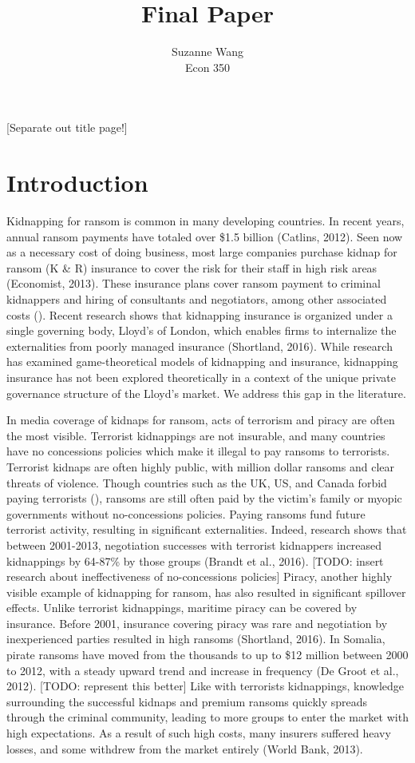 \documentclass[12pt]{article}
\begin{document}
 
\title{Final Paper}
\author{Suzanne Wang \\ 
Econ 350} 
\maketitle

[Separate out title page!]

\section{Introduction}

Kidnapping for ransom is common in many developing countries. In recent years, annual ransom payments have totaled over \$1.5 billion (Catlins, 2012). Seen now as a necessary cost of doing business, most large companies purchase kidnap for ransom (K \& R) insurance to cover the risk for their staff in high risk areas (Economist, 2013). These insurance plans cover ransom payment to criminal kidnappers and hiring of consultants and negotiators, among other associated costs (). Recent research shows that kidnapping insurance is organized under a single governing body, Lloyd's of London, which enables firms to internalize the externalities from poorly managed insurance (Shortland, 2016). While research has examined game-theoretical models of kidnapping and insurance, kidnapping insurance has not been explored theoretically in a context of the unique private governance structure of the Lloyd's market. We address this gap in the literature.

In media coverage of kidnaps for ransom, acts of terrorism and piracy are often the most visible. Terrorist kidnappings are not insurable, and many countries have no concessions policies which make it illegal to pay ransoms to terrorists. Terrorist kidnaps are often highly public, with million dollar ransoms and clear threats of violence. Though countries such as the UK, US, and Canada forbid paying terrorists (), ransoms are still often paid by the victim's family or myopic governments without no-concessions policies. Paying ransoms fund future terrorist activity, resulting in significant externalities. Indeed, research shows that between 2001-2013, negotiation successes with terrorist kidnappers increased kidnappings by 64-87\% by those groups (Brandt et al., 2016). [TODO: insert research about ineffectiveness of no-concessions policies] Piracy, another highly visible example of kidnapping for ransom, has also resulted in significant spillover effects. Unlike terrorist kidnappings, maritime piracy can be covered by insurance. Before 2001, insurance covering piracy was rare and negotiation by inexperienced parties resulted in high ransoms (Shortland, 2016). In Somalia, pirate ransoms have moved from the thousands to up to \$12 million between 2000 to 2012, with a steady upward trend and increase in frequency (De Groot et al., 2012). [TODO: represent this better] Like with terrorists kidnappings, knowledge surrounding the successful kidnaps and premium ransoms quickly spreads through the criminal community, leading to more groups to enter the market with high expectations. As a result of such high costs, many insurers suffered heavy losses, and some withdrew from the market entirely (World Bank, 2013).
\end{document}
